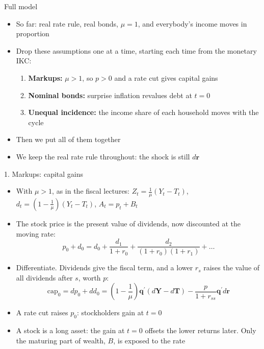 \documentclass[10pt,english]{beamer}
\begin{document}
\begin{frame}{Full model}
\begin{itemize}
\item <+->So far: real rate rule, real bonds, $\mu=1$, and everybody's income moves in proportion
\item <+->Drop these assumptions one at a time, starting each time from the monetary IKC:
\begin{enumerate}
\item \textbf{Markups:} $\mu>1$, so $p>0$ and a rate cut gives capital gains
\item \textbf{Nominal bonds:} surprise inflation revalues debt at $t=0$
\item \textbf{Unequal incidence:} the income share of each household moves with the cycle
\end{enumerate}
\item <+->Then we put all of them together
\item <+->We keep the real rate rule throughout: the shock is still $d\boldsymbol{r}$
\end{itemize}
\end{frame}
%
\begin{frame}{1. Markups: capital gains}
\vspace{-1mm}
\begin{itemize}
\item <+->With $\mu>1$, as in the fiscal lectures: $Z_{t}=\frac{1}{\mu}\left(Y_{t}-T_{t}\right)$, $d_{t}=\left(1-\frac{1}{\mu}\right)\left(Y_{t}-T_{t}\right)$, $A_{t}=p_{t}+B_{t}$
\item <+->The stock price is the present value of dividends, now discounted at the moving rate:
\[
p_{0}+d_{0}=d_{0}+\frac{d_{1}}{1+r_{0}}+\frac{d_{2}}{(1+r_{0})(1+r_{1})}+\dots
\]
\item <+->Differentiate. Dividends give the fiscal term, and a lower $r_{s}$ raises the value of all dividends after $s$, worth $p$:
\[
\text{cap}_{0}=dp_{0}+dd_{0}=\left(1-\frac{1}{\mu}\right)\boldsymbol{q}^{\prime}\left(d\boldsymbol{Y}-d\boldsymbol{T}\right)-\frac{p}{1+r_{ss}}\boldsymbol{q}^{\prime}d\boldsymbol{r}
\]
\item <+->A rate cut raises $p_{0}$: stockholders gain at $t=0$
\item <+->A stock is a long asset: the gain at $t=0$ offsets the lower returns later. Only the maturing part of wealth, $B$, is exposed to the rate
\end{itemize}
\end{frame}
%
\end{document}
